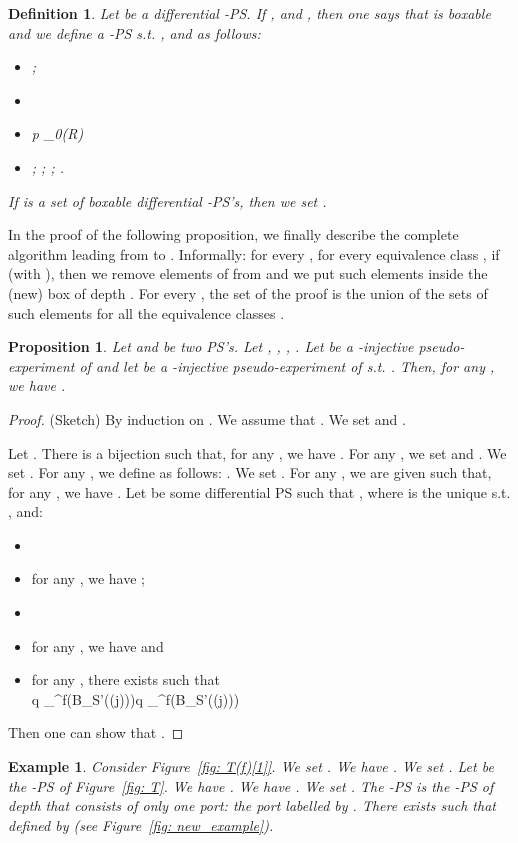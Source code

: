 \documentclass{article}
\theoremstyle{plain}
\newtheorem{definition}{Definition}
\newtheorem{example}{Example}
\newtheorem{prop}[theorem]{Proposition}
\newcommand{\cod}{\oc}
\newcommand{\wiresatzero}[1]{\mathcal{W}_0(#1)}
\newcommand{\conclusionscirc}[1]{\mathcal{P}_\circ^{\textsf{f}}(#1)}
\newcommand{\conclusionsnotcirc}[1]{\mathcal{P}_\bullet^{\textsf{f}}(#1)}
\begin{document}
\begin{definition}\label{defin: overline}Let  be a differential -PS. If ,  and , then one says that  is \emph{boxable} and we define a -PS  s.t. ,  and  as follows:
\begin{itemize}
\item ;
\item 
\item p \in \wiresatzero{R}
\item ; ; ; .
\end{itemize}
If  is a set of boxable differential -PS's, 
then we set .
\end{definition}

In the proof of the following proposition, we finally describe the complete algorithm leading from  to .
 Informally: for every , for every equivalence class , if  (with ), then we remove  elements of  from  and we put  such elements inside the (new) box  of depth . For every , the set  of the proof is the union of the sets of such  elements for all the equivalence classes .


\begin{prop}\label{prop: from i to i+1}
Let  and  be two PS's. Let , , , . Let  be a -injective pseudo-experiment of  and let  be a -injective pseudo-experiment of  s.t. . Then, for any , we have .
\end{prop}

\begin{proof}
(Sketch) By induction on . We assume that . We set  and .

Let . There is a bijection  such that, for any ,  we have  . 
For any , we set  and . We set . For any , we define  as follows: . We set  . 
For any , we are given  such that, for any , we have . Let  be some differential PS such that , where  is the unique  s.t. , and:
\begin{itemize}
\item 
\item for any , we have 
;
\item 
\item for any , we have  and 
\item for any , there exists  such that \\ q \in \conclusionscirc{B_{S'}(\cod(j))}q \in \conclusionsnotcirc{B_{S'}(\cod(j))}
\end{itemize}
Then one can show that .
\end{proof}



\begin{example}
Consider Figure~\ref{fig: T(f)[1]}. We set . We have . We set . Let  be the -PS of Figure~\ref{fig: T}. We have . We have . We set . The -PS  is the -PS of depth  that consists of only one port: the port  labelled by . There exists  such that  defined by  (see Figure~\ref{fig: new_example}).
\end{example}
\end{document}
